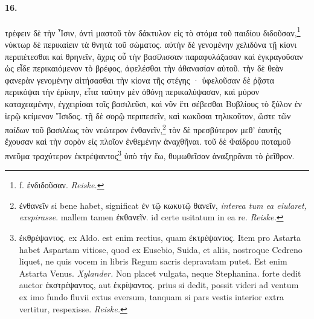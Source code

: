 \documentclass[a4paper, 11pt, oneside, polutonikogreek, german, landscape]{article}
\begin{document}
\paragraph{16.}
τρέφειν δὲ τὴν Ἶσιν, ἀντὶ μαστοῦ τὸν δάκτυλον εἰς τὸ στόμα τοῦ παιδίου διδοῦσαν,\footnote{f. ἐνδιδοῦσαν. \emph{Reiske.}} νύκτωρ δὲ περικαίειν τὰ θνητὰ τοῦ σώματος. αὐτὴν δὲ γενομένην χελιδόνα τῇ κίονι περιπέτεσθαι καὶ θρηνεῖν, ἄχρις οὗ τὴν βασίλισσαν παραφυλάξασαν καὶ ἐγκραγοῦσαν ὡς εἶδε περικαιόμενον τὸ βρέφος, ἀφελέσθαι τὴν ἀθανασίαν αὐτοῦ. τὴν δὲ θεὰν φανερὰν γενομένην αἰτήσασθαι τὴν κίονα τῆς στέγης · ὑφελοῦσαν δὲ ῥᾷστα περικόψαι τὴν ἐρίκην, εἶτα ταύτην μὲν ὀθόνῃ περικαλύψασαν, καὶ μύρον καταχεαμένην, ἐγχειρίσαι τοῖς βασιλεῦσι, καὶ νῦν ἔτι σέβεσθαι Βυβλίους τὸ ξύλον ἐν ἱερῷ κείμενον Ἴσιδος. τῇ δὲ σορῷ περιπεσεῖν, καὶ κωκῦσαι τηλικοῦτον, ὥστε τῶν παίδων τοῦ βασιλέως τὸν νεώτερον ἐνθανεῖν,\footnote{ἐνθανεῖν si bene habet, significat ἐν τῷ κωκυτῷ θανεῖν, \emph{interea tum ea eiularet, exspirasse}. mallem tamen ἐκθανεῖν. id certe usitatum in ea re. \emph{Reiske.}} τὸν δὲ πρεσβύτερον μεθ' ἑαυτῆς ἔχουσαν καὶ τὴν σορὸν εἰς πλοῖον ἐνθεμένην ἀναχθῆναι. τοῦ δὲ Φαίδρου ποταμοῦ πνεῦμα τραχύτερον ἐκτρέψαντος\footnote{ἐκθρέψαντος. ex Aldo. est enim rectius, quam ἐκτρέψαντος. Item pro Astarta habet Aspartam vitiose, quod ex Eusebio, Suida, et aliis, nostroque Cedreno liquet, ne quis vocem in libris Regum sacris depravatam putet. Est enim Astarta Venus. \emph{Xylander.} Non placet vulgata, neque Stephanina. forte dedit auctor ἐκστρέψαντος, aut ἐκρίψαντος. prius si dedit, possit videri ad ventum ex imo fundo fluvii extus eversum, tanquam si pars vestis interior extra vertitur, respexisse. \emph{Reiske.}} ὑπὸ τὴν ἕω, θυμωθεῖσαν ἀναξηρᾶναι τὸ ῥεῖθρον.
\end{document}
